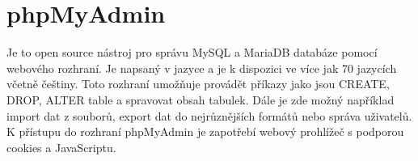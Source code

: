 \section{phpMyAdmin}

Je to open source nástroj pro správu MySQL a MariaDB databáze pomocí
webového rozhraní. Je napsaný v jazyce  a je k dispozici ve více jak 70
jazycích včetně češtiny. Toto rozhraní umožňuje provádět  příkazy
jako jsou CREATE, DROP, ALTER table a spravovat obsah tabulek. Dále je
zde možný například import dat z  souborů, export dat do
nejrůznějších formátů nebo správa uživatelů. K přístupu do rozhraní
phpMyAdmin je zapotřebí webový prohlížeč s podporou cookies a
JavaScriptu. \cite{phpmyadmin} \cite{phpmyadmin-2}






